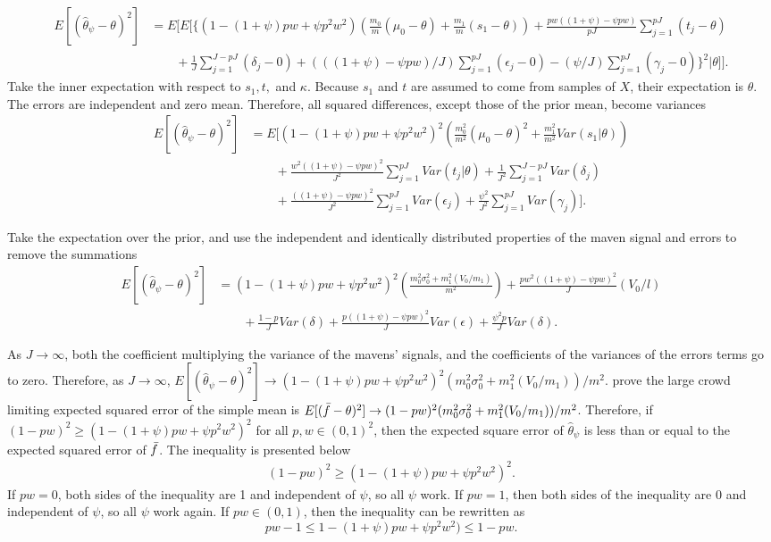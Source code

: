 \begin{appendix}
\begin{align*}
    E[(\hat{\theta}_{\psi} - \theta)^2] &= E[E[ \{(1-(1+\psi)pw + \psi p^2w^2)(\frac{m_0}{m}(\mu_0 -\theta) + \frac{m_1}{m}(s_1-\theta)) + \frac{pw((1+\psi) - \psi pw)}{pJ}\sum_{j=1}^{pJ}(t_j - \theta) \\ & \quad \quad + \frac{1}{J}\sum_{j=1}^{J-pJ}(\delta_j-0)  + (((1+\psi)-\psi pw)/J)\sum_{j=1}^{pJ}(\epsilon_j-0) -(\psi /J)\sum_{j=1}^{pJ}(\gamma_j-0)\}^2|\theta]]. 
\end{align*}
Take the inner expectation with respect to $s_1, t,$ and $\kappa$. Because $s_1$ and $t$ are assumed to come from samples of $X$, their expectation is $\theta$. The errors are independent and zero mean. Therefore, all squared differences, except those of the prior mean, become variances
\begin{align*}
    E[(\hat{\theta}_{\psi} - \theta)^2] &= E[(1-(1+\psi)pw + \psi p^2w^2)^2(\frac{m_0^2}{m^2}(\mu_0 - \theta)^2 + \frac{m_1^2}{m^2}Var(s_1|\theta))\\ & \quad \quad + \frac{w^2((1+\psi)-\psi pw)^2}{J^2}\sum_{j=1}^{pJ}Var(t_j|\theta)  + \frac{1}{J^2}\sum_{j=1}^{J-pJ}Var(\delta_j)  \\
    & \quad \quad +\frac{((1+\psi)-\psi pw)^2}{J^2}\sum_{j=1}^{pJ}Var(\epsilon_j) + \frac{\psi ^2}{J^2}\sum_{j=1}^{pJ}Var(\gamma_j)]. 
\end{align*}

Take the expectation over the prior, and use the independent and identically distributed properties of the maven signal and errors to remove the summations
\begin{align*}
    E[(\hat{\theta}_{\psi} - \theta)^2] &= (1-(1+\psi)pw + \psi p^2w^2)^2(\frac{m_0^2\sigma_0^2 + m_1^2(V_0/m_1)}{m^2}) +  \frac{pw^2((1+\psi)-\psi pw)^2}{J}(V_0/l) \\
    &\quad \quad + \frac{1-p}{J}Var(\delta) + \frac{p((1+\psi)-\psi pw)^2}{J}Var(\epsilon) + \frac{\psi ^2p}{J}Var(\delta).
\end{align*}

As $J \rightarrow \infty$, both the coefficient multiplying the variance of the mavens' signals, and the coefficients of the variances of the errors terms go to zero. Therefore, as $J \rightarrow \infty$, $E[(\hat{\theta}_{\psi} - \theta)^2] \rightarrow (1-(1+\psi)pw + \psi p^2w^2)^2(m_0^2\sigma_0^2 + m_1^2(V_0/m_1))/{m^2}$. \cite{mp} prove the large crowd limiting expected squared error of the simple mean is  $E[(\Bar{f} - \theta)^2] \rightarrow (1-pw)^2({m_0^2\sigma_0^2 + m_1^2(V_0/m_1)})/{m^2}$. Therefore, if $(1-pw)^2 \geq (1-(1+\psi)pw + \psi p^2w^2)^2$ for all $p,w \in (0,1)^2$, then the expected square error of $\hat{\theta}_{\psi}$ is less than or equal to the expected squared error of $\Bar{f}$.  The inequality is presented below
\begin{align*}
    (1-pw)^2 \geq (1-(1+\psi)pw + \psi p^2w^2)^2.
\end{align*}
If $pw = 0$, both sides of the inequality are 1 and independent of $\psi$, so all $\psi$ work. If $pw = 1$, then both sides of the inequality are 0 and independent of $\psi$, so all $\psi$ work again. If $pw\in (0,1)$, then the inequality can be rewritten as
\[pw -1 \leq 1-(1+\psi)pw + \psi p^2w^2) \leq 1-pw.\]


\end{appendix}
